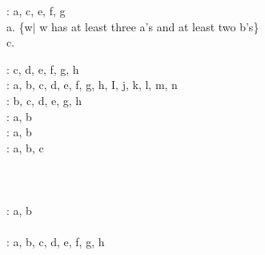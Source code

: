 \documentclass[12pt]{article}
\begin{document}
: a, c, e, f, g \\

a. \{w$|$ w has at least three a’s and at least two b’s\} \\

c. 

: c, d, e, f, g, h \\


: a, b, c, d, e, f, g, h, I, j, k, l, m, n \\


: b, c, d, e, g, h \\


: a, b \\


: a, b \\


: a, b, c \\


 \\


 \\

 \\

: a, b \\

 \\

: a, b, c, d, e, f, g, h \\

 \\

 \\
\end{document}
